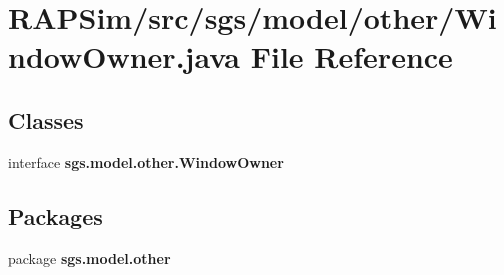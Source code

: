 \section{R\-A\-P\-Sim/src/sgs/model/other/\-Window\-Owner.java File Reference}
\label{_window_owner_8java}
\subsection*{Classes}
\begin{DoxyCompactItemize}
\item 
interface {\bf sgs.\-model.\-other.\-Window\-Owner}
\end{DoxyCompactItemize}
\subsection*{Packages}
\begin{DoxyCompactItemize}
\item 
package {\bf sgs.\-model.\-other}
\end{DoxyCompactItemize}
